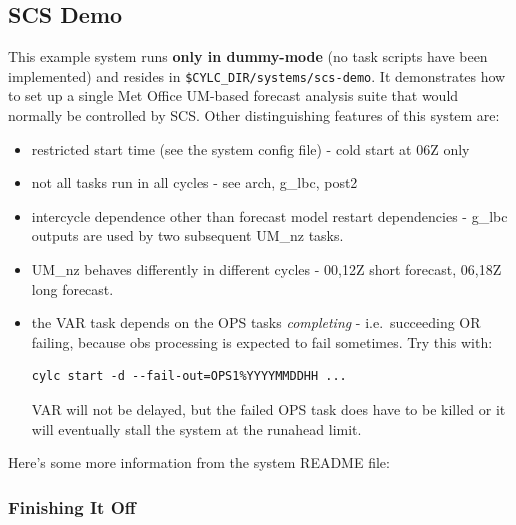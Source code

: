 \documentclass[11pt,a4paper]{article}
\begin{document}
\pagebreak
\subsection{SCS Demo}

This example system runs {\bf only in dummy-mode} (no task scripts
have been implemented) and resides in
\lstinline=$CYLC_DIR/systems/scs-demo=.
It demonstrates how to set up a single Met Office
UM-based forecast analysis suite that would normally be controlled by
SCS.  Other distinguishing features of this system are:

\begin{itemize}

    \item restricted start time (see the system config file) - cold start at 06Z only

    \item not all tasks run in all cycles - see arch, g\_lbc, post2

    \item intercycle dependence other than forecast model restart 
        dependencies - g\_lbc outputs are used by two subsequent UM\_nz
        tasks.

    \item UM\_nz behaves differently in different cycles - 00,12Z short
        forecast, 06,18Z long forecast.

    \item the VAR task depends on the OPS tasks {\em completing} - i.e.\
        succeeding OR failing, because obs processing is expected to
        fail sometimes.  Try this with:

        \begin{lstlisting}
cylc start -d --fail-out=OPS1%YYYYMMDDHH ...
        \end{lstlisting}

        VAR will not be delayed, but the failed OPS task does have to be
        killed or it will eventually stall the system at the runahead
        limit.
        
\end{itemize}

Here's some more information from the system README file:

\lstset{language=}


\subsubsection{Finishing It Off}
\end{document}
